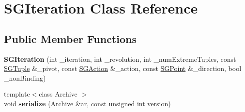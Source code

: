 \hypertarget{class_s_g_iteration}{\section{S\+G\+Iteration Class Reference}
\label{class_s_g_iteration}
}
\subsection*{Public Member Functions}
\begin{DoxyCompactItemize}
\item 
\hypertarget{class_s_g_iteration_a6c8811a084f0bfa216219b2bce504a45}{{\bfseries S\+G\+Iteration} (int \+\_\+iteration, int \+\_\+revolution, int \+\_\+num\+Extreme\+Tuples, const \hyperlink{class_s_g_tuple}{S\+G\+Tuple} \&\+\_\+pivot, const \hyperlink{class_s_g_action}{S\+G\+Action} \&\+\_\+action, const \hyperlink{class_s_g_point}{S\+G\+Point} \&\+\_\+direction, bool \+\_\+non\+Binding)}\label{class_s_g_iteration_a6c8811a084f0bfa216219b2bce504a45}

\item 
\hypertarget{class_s_g_iteration_a19860e6d2af702df4ce47e36d4d43ec5}{{\footnotesize template$<$class Archive $>$ }\\void {\bfseries serialize} (Archive \&ar, const unsigned int version)}\label{class_s_g_iteration_a19860e6d2af702df4ce47e36d4d43ec5}

\end{DoxyCompactItemize}
